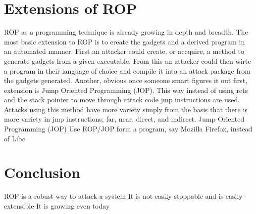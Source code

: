 \documentclass[11pt]{amsart}
\begin{document}
\section*{Extensions of ROP}
ROP as a programming technique is already growing in depth and breadth.  The most basic extension to ROP is to create the gadgets and a derived program in an automated manner.  First an attacker could create, or accquire, a method to generate gadgets from a given executable.  From this an attacker could then wirte a program in their language of choice and compile it into an attack package from the gadgets generated.
Another, obvious once someone smart figures it out first, extension is Jump Oriented Programming (JOP).  This way instead of using rets and the stack pointer to move through attack code jmp instructions are used.  Attacks using this method have more variety simply from the basis that there is more variety in jmp instructions; far, near, direct, and indirect.  
Jump Oriented Programming (JOP)
Use ROP/JOP form a program, say Mozilla Firefox, instead of Libc
\section*{Conclusion}
ROP is a robust way to attack a system
It is not easily stoppable and is easily extensible
It is growing even today
\end{document}
